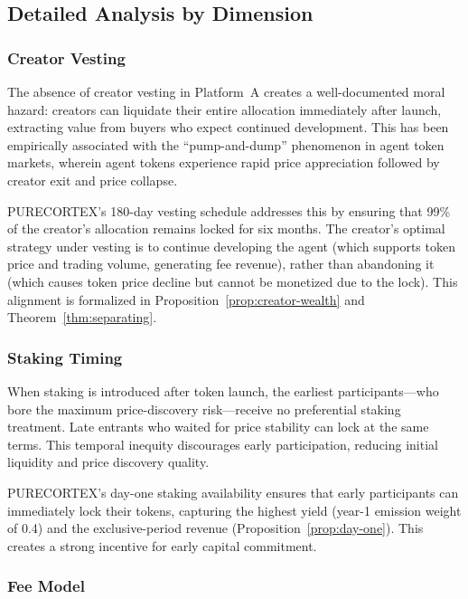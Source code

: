 \subsection{Detailed Analysis by Dimension}
\label{subsec:dim-analysis}

\subsubsection{Creator Vesting}

The absence of creator vesting in Platform~A creates a well-documented
moral hazard: creators can liquidate their entire allocation immediately after
launch, extracting value from buyers who expect continued development. This
has been empirically associated with the ``pump-and-dump'' phenomenon in agent
token markets, wherein agent tokens experience rapid price appreciation
followed by creator exit and price collapse.

PURECORTEX's 180-day vesting schedule addresses this by ensuring that 99\% of
the creator's allocation remains locked for six months. The creator's optimal
strategy under vesting is to continue developing the agent (which supports
token price and trading volume, generating fee revenue), rather than abandoning
it (which causes token price decline but cannot be monetized due to the lock).
This alignment is formalized in Proposition~\ref{prop:creator-wealth} and
Theorem~\ref{thm:separating}.

\subsubsection{Staking Timing}

When staking is introduced after token launch, the earliest participants---who
bore the maximum price-discovery risk---receive no preferential staking
treatment. Late entrants who waited for price stability can lock at the same
terms. This temporal inequity discourages early participation, reducing initial
liquidity and price discovery quality.

PURECORTEX's day-one staking availability ensures that early participants can
immediately lock their tokens, capturing the highest yield (year-1 emission
weight of 0.4) and the exclusive-period revenue (Proposition~\ref{prop:day-one}).
This creates a strong incentive for early capital commitment.

\subsubsection{Fee Model}

